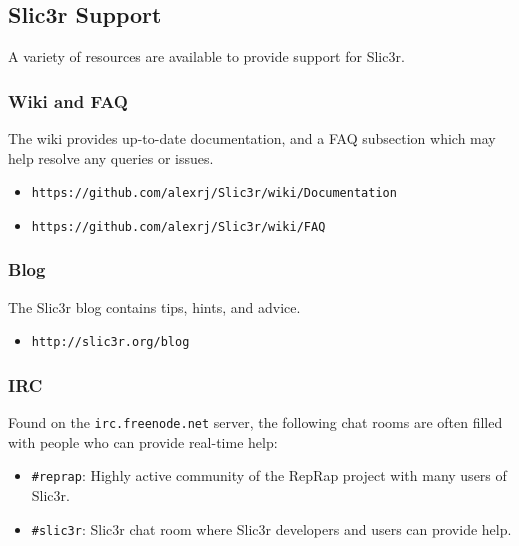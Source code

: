 \subsection{Slic3r Support} %
\label{sec:slic3r_support}


A variety of resources are available to provide support for Slic3r.
\subsubsection{Wiki and FAQ} %
\label{sub:wiki_and_faq}
The wiki provides up-to-date documentation, and a FAQ subsection which may help resolve any queries or issues.
\begin{itemize}
    \item \texttt{https://github.com/alexrj/Slic3r/wiki/Documentation}
    \item \texttt{https://github.com/alexrj/Slic3r/wiki/FAQ}
\end{itemize}

\subsubsection{Blog} %
\label{sub:blog}
The Slic3r blog contains tips, hints, and advice.
\begin{itemize}
    \item \texttt{http://slic3r.org/blog}
\end{itemize}

\subsubsection{IRC} %
\label{sub:irc}

Found on the \texttt{irc.freenode.net} server, the following chat rooms are often filled with people who can provide real-time help:
\begin{itemize}
\item \texttt{\#reprap}: Highly active community of the RepRap project with many users of Slic3r.
\item \texttt{\#slic3r}: Slic3r chat room where Slic3r developers and users can provide help.
\end{itemize}


